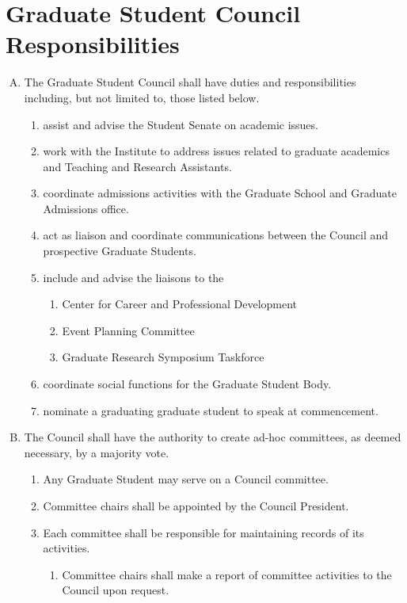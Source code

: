 \documentclass[letterpaper,12pt]{article}
\begin{document}
\section{Graduate Student Council \\ Responsibilities}
\begin{enumerate}[A.]
	\item The Graduate Student Council shall have duties and responsibilities
	including, but not limited to, those listed below.
	\begin{enumerate}[1.]
		\item assist and advise the Student Senate on academic issues.
		\item work with the Institute to address issues related to graduate
		academics and Teaching and Research Assistants.
		\item coordinate admissions activities with the Graduate School and
		Graduate Admissions office.
		\item act as liaison and coordinate communications between the Council
		and prospective Graduate Students.
		\item include and advise the liaisons to the
		\begin{enumerate}[1.]
			\item Center for Career and Professional Development
			\item Event Planning Committee
			\item Graduate Research Symposium Taskforce
		\end{enumerate}
		\item coordinate social functions for the Graduate Student Body.
		\item nominate a graduating graduate student to speak at
		commencement.
	\end{enumerate}
	\item The Council shall have the authority to create ad-hoc committees, as deemed necessary, by a majority vote.
	\begin{enumerate}[1.]
		\item Any Graduate Student may serve on a Council committee.
		\item Committee chairs shall be appointed by the Council President.
		\item Each committee shall be responsible for maintaining records of its
		activities.
		\begin{enumerate}[1.]
			\item Committee chairs shall make a report of committee activities to the Council upon request.
		\end{enumerate}
	\end{enumerate} 
\end{enumerate}
\end{document}
